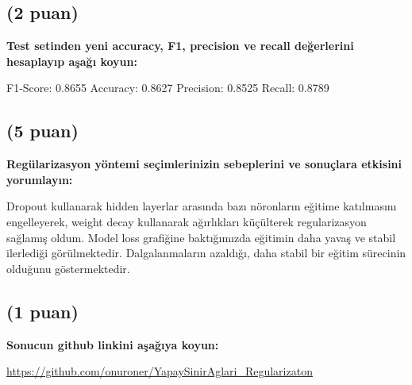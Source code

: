 \documentclass[11pt]{article}
\begin{document}
\subsection{(2 puan)} \textbf{Test setinden yeni accuracy, F1, precision ve recall değerlerini hesaplayıp aşağı koyun:}

F1-Score: 0.8655
Accuracy: 0.8627
Precision: 0.8525
Recall: 0.8789

\subsection{(5 puan)} \textbf{Regülarizasyon yöntemi seçimlerinizin sebeplerini ve sonuçlara etkisini yorumlayın:}

Dropout kullanarak hidden layerlar arasında bazı nöronların eğitime katılmasını engelleyerek, weight decay kullanarak ağırlıkları küçülterek regularizasyon sağlamış oldum. Model loss grafiğine baktığımızda eğitimin daha yavaş ve stabil ilerlediği görülmektedir. Dalgalanmaların azaldığı, daha stabil bir eğitim sürecinin olduğunu göstermektedir.

\subsection{(1 puan)} \textbf{Sonucun github linkini  aşağıya koyun:}

\url{https://github.com/onuroner/YapaySinirAglari_Regularizaton}
\end{document}
